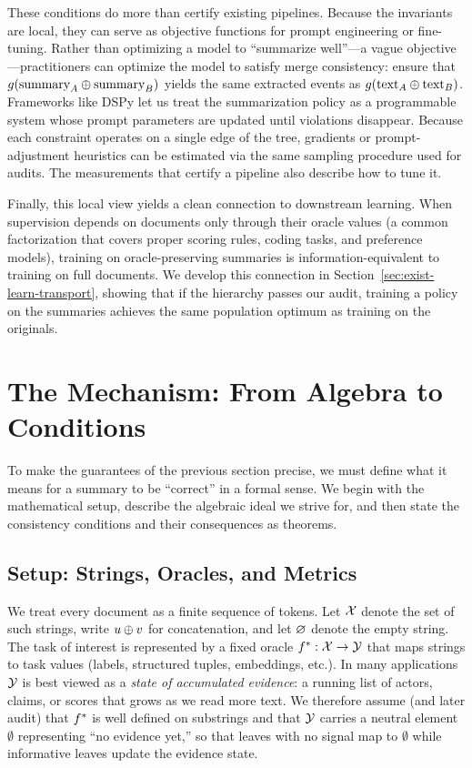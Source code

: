 These conditions do more than certify existing pipelines. Because the invariants are local, they can serve as objective functions for prompt engineering or fine-tuning. Rather than optimizing a model to ``summarize well''---a vague objective---practitioners can optimize the model to satisfy merge consistency: ensure that $g(\text{summary}_A \oplus \text{summary}_B)$ yields the same extracted events as $g(\text{text}_A \oplus \text{text}_B)$. Frameworks like DSPy \citep{khattab2024dspy} let us treat the summarization policy as a programmable system whose prompt parameters are updated until violations disappear. Because each constraint operates on a single edge of the tree, gradients or prompt-adjustment heuristics can be estimated via the same sampling procedure used for audits. The measurements that certify a pipeline also describe how to tune it.

Finally, this local view yields a clean connection to downstream learning. When supervision depends on documents only through their oracle values (a common factorization that covers proper scoring rules, coding tasks, and preference models), training on oracle-preserving summaries is information-equivalent to training on full documents. We develop this connection in Section~\ref{sec:exist-learn-transport}, showing that if the hierarchy passes our audit, training a policy on the summaries achieves the same population optimum as training on the originals.


\section{The Mechanism: From Algebra to Conditions}\label{sec:mechanism}

To make the guarantees of the previous section precise, we must define what it means for a summary to be ``correct'' in a formal sense. We begin with the mathematical setup, describe the algebraic ideal we strive for, and then state the consistency conditions and their consequences as theorems.

\subsection{Setup: Strings, Oracles, and Metrics}

We treat every document as a finite sequence of tokens. Let $\mathcal{X}$ denote the set of such strings, write $u \oplus v$ for concatenation, and let $\varnothing$ denote the empty string. The task of interest is represented by a fixed oracle $f^{\ast}: \mathcal{X} \to \mathcal{Y}$ that maps strings to task values (labels, structured tuples, embeddings, etc.). In many applications $\mathcal{Y}$ is best viewed as a \emph{state of accumulated evidence}: a running list of actors, claims, or scores that grows as we read more text. We therefore assume (and later audit) that $f^{\ast}$ is well defined on substrings and that $\mathcal{Y}$ carries a neutral element $\emptyset$ representing ``no evidence yet,'' so that leaves with no signal map to $\emptyset$ while informative leaves update the evidence state.

